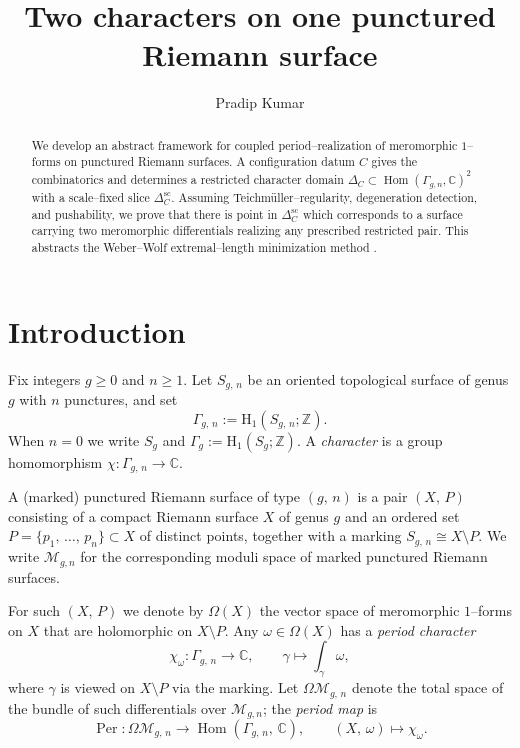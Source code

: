 \documentclass[a4paper,12pt]{amsart}
\title[Two characters on one surface]{Two characters on one punctured Riemann surface}
\author{Pradip Kumar}
\date{}
\newcommand{\C}{\mathbb{C}}
\newcommand{\Z}{\mathbb{Z}}
\newcommand{\Hom}{\operatorname{Hom}}
\newcommand{\Per}{\operatorname{Per}}
\newcommand{\Mgn}{\mathcal{M}_{g,n}}
\newcommand{\Om}{\Omega}
\theoremstyle{plain}
\theoremstyle{definition}
\begin{document}
\begin{abstract}
We develop an abstract framework for coupled period--realization of meromorphic $1$--forms on punctured Riemann surfaces.
A configuration datum $C$ gives the combinatorics and determines a restricted character domain
$\Delta_C\subset\Hom(\Gamma_{g,n},\C)^2$ with a scale--fixed slice $\Delta_C^{\mathrm{sc}}$. 
Assuming Teichm\"uller--regularity, degeneration detection, and pushability, we prove that there is point in $\Delta_C^{\mathrm{sc}}$  which corresponds to a surface carrying two meromorphic differentials realizing any prescribed restricted pair.
This abstracts the Weber--Wolf extremal--length minimization method \cite{WeberWolfGAFA,WeberWolfAnnals}.
\end{abstract}

\maketitle

\tableofcontents
\section{Introduction}
Fix integers $g\ge 0$ and $n\ge 1$.
Let $S_{g,\, n}$ be an oriented topological surface of genus $g$ with $n$ punctures, and set
\[
\Gamma_{g,\, n}:=\mathrm{H}_1(S_{g,\, n};\Z). 
\]
When $n=0$ we write $S_g$ and $\Gamma_g:=\mathrm{H}_1(S_g;\Z)$. A \emph{character} is a group homomorphism
$\chi:\Gamma_{g,\, n}\longrightarrow\C$.

A (marked) punctured Riemann surface of type $(g , \, n)$ is a pair $(X, \, P)$ consisting of a compact Riemann surface $X$ of genus
$g$ and an ordered set $P=\{p_1,\, \dots,\, p_n\}\subset X$ of distinct points, together with a marking
$S_{g,\, n}\cong X\setminus P$.
We write $\Mgn$ for the corresponding moduli space of marked punctured Riemann surfaces.

For such $(X,\, P)$ we denote by $\Om(X)$ the vector space of meromorphic $1$--forms on $X$ that are holomorphic on
$X\setminus P$.
Any $\omega\in\Om(X)$ has a \emph{period character}
\[
\chi_\omega:\Gamma_{g,\, n}\longrightarrow \C,\qquad \gamma\longmapsto \int_\gamma \omega,
\]
where $\gamma$ is viewed on $X\setminus P$ via the marking.
Let $\Omega\mathcal M_{g,\, n}$ denote the total space of the bundle of such differentials over $\Mgn$; the \emph{period map}
is
\[
\Per:\Omega\mathcal M_{g,\, n}\longrightarrow \Hom(\Gamma_{g,\, n},\, \C),\qquad (X,\, \omega)\longmapsto \chi_\omega.
\]
\end{document}
